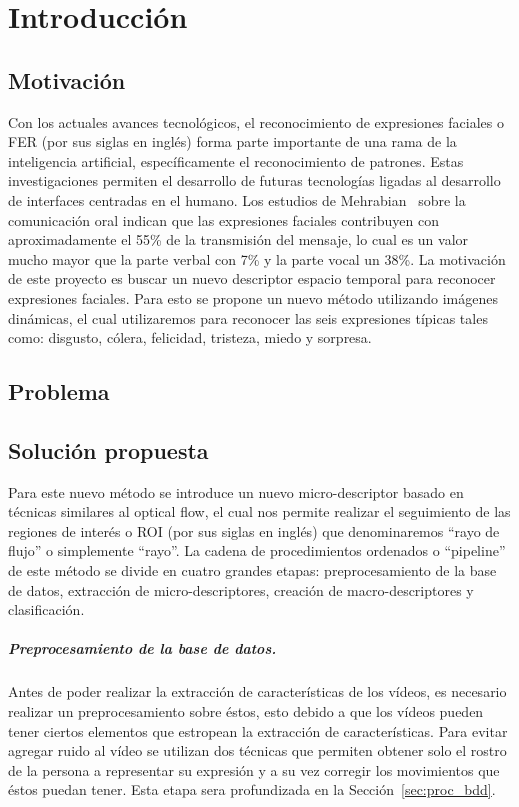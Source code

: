 \chapter[Introducción]{Introducción}
\label{ch:intro}

\section{Motivación}
\label{sec:motivacion}
Con los actuales avances tecnológicos, el reconocimiento de expresiones faciales o FER (por sus siglas en inglés) forma parte importante de una rama de la inteligencia artificial, específicamente el reconocimiento de patrones.  Estas investigaciones permiten el desarrollo de futuras tecnologías ligadas al desarrollo de interfaces centradas en el humano. 
Los estudios de Mehrabian~\cite{MEHRABIAN1968} sobre la comunicación oral indican que las expresiones faciales contribuyen con aproximadamente el 55\% de la transmisión del mensaje, lo cual es un valor mucho mayor que la parte verbal con 7\% y la parte vocal un 38\%.
La motivación de este proyecto es buscar un nuevo descriptor espacio temporal para reconocer expresiones faciales. Para esto se propone un nuevo método utilizando imágenes dinámicas, el cual utilizaremos para reconocer las seis expresiones típicas tales como: disgusto, cólera, felicidad, tristeza, miedo y sorpresa.

\section{Problema}
\label{sec:problema}



\section{Solución propuesta}
\label{sec:solucion}

Para este nuevo método se introduce un nuevo micro-descriptor basado en técnicas similares al optical flow, el cual nos permite realizar el seguimiento de las regiones de interés o ROI (por sus siglas en inglés) que denominaremos ``rayo de flujo'' o simplemente ``rayo''.
La cadena de procedimientos ordenados o ``pipeline'' de este método se divide en cuatro grandes
etapas: preprocesamiento de la base de datos, extracción de micro-descriptores, creación de macro-descriptores y clasificación.

\paragraph{Preprocesamiento de la base de datos.}
\label{ch1:par:preprocesamientobdd}
Antes de poder realizar la extracción de características de los vídeos, es necesario realizar un preprocesamiento sobre éstos, esto debido a que los vídeos pueden tener ciertos elementos que estropean la extracción de características. Para evitar agregar ruido al vídeo se utilizan dos técnicas que permiten obtener solo el rostro de la persona a representar su expresión y a su vez corregir los movimientos que éstos puedan tener. Esta etapa sera profundizada en la Sección~\ref{sec:proc_bdd}.


